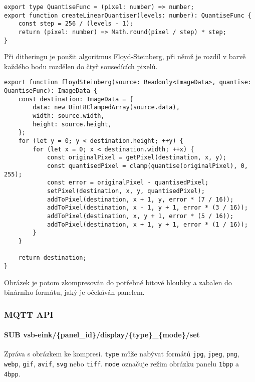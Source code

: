 \begin{lstlisting}[label=src:quantise-func,caption={Implementace univerzální kvantizační funkce použité při kompresi barev obrázků}]
export type QuantiseFunc = (pixel: number) => number;
export function createLinearQuantiser(levels: number): QuantiseFunc {
	const step = 256 / (levels - 1);
	return (pixel: number) => Math.round(pixel / step) * step;
}
\end{lstlisting}

Při ditheringu je použit algoritmus Floyd-Steinberg, při němž je rozdíl v barvě každého bodu rozdělen do čtyř sousedících pixelů.

\begin{lstlisting}[label=src:floydsteinberg-func,caption={Implementace Floyd-Steinbergova dithering algoritmu}]
export function floydSteinberg(source: Readonly<ImageData>, quantise: QuantiseFunc): ImageData {
	const destination: ImageData = {
		data: new Uint8ClampedArray(source.data),
		width: source.width,
		height: source.height,
	};
	for (let y = 0; y < destination.height; ++y) {
		for (let x = 0; x < destination.width; ++x) {
			const originalPixel = getPixel(destination, x, y);
			const quantisedPixel = clamp(quantise(originalPixel), 0, 255);
			const error = originalPixel - quantisedPixel;
			setPixel(destination, x, y, quantisedPixel);
			addToPixel(destination, x + 1, y, error * (7 / 16));
			addToPixel(destination, x - 1, y + 1, error * (3 / 16));
			addToPixel(destination, x, y + 1, error * (5 / 16));
			addToPixel(destination, x + 1, y + 1, error * (1 / 16));
		}
	}

	return destination;
}
\end{lstlisting}

Obrázek je potom zkompresován do potřebné bitové hloubky a zabalen do binárního formátu, jaký je očekáván panelem.

\subsubsection{MQTT API}
\paragraph*{SUB vsb-eink/\{panel\_id\}/display/\{type\}\_\{mode\}/set}
Zpráva s obrázkem ke kompresi. \lstinline|type| může nabývat formátů \lstinline|jpg|, \lstinline|jpeg|, \lstinline|png|, \lstinline|webp|, \lstinline|gif|, \lstinline|avif|, \lstinline|svg| nebo \lstinline|tiff|. \lstinline|mode| označuje režim obrázku panelu \lstinline|1bpp| a \lstinline|4bpp|.

